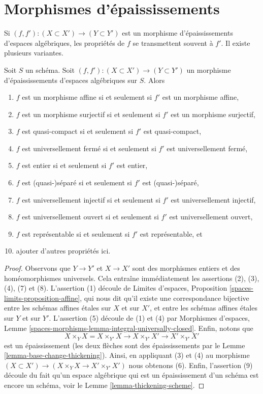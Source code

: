 \section{Morphismes d'épaississements}
\label{section-morphisms-thickenings}

\noindent
Si $(f, f') : (X \subset X') \to (Y \subset Y')$ est un morphisme
d'épaississements d'espaces algébriques, les propriétés de $f$
se transmettent souvent à $f'$. Il existe plusieurs variantes.

\begin{lemma}
\label{lemma-thicken-property-morphisms}
Soit $S$ un schéma. Soit $(f, f') : (X \subset X') \to (Y \subset Y')$
un morphisme d'épaississements d'espaces algébriques sur $S$. Alors
\begin{enumerate}
\item $f$ est un morphisme affine si et seulement si $f'$ est un morphisme affine,
\item $f$ est un morphisme surjectif si et seulement si $f'$ est un morphisme surjectif,
\item $f$ est quasi-compact si et seulement si $f'$ est quasi-compact,
\item $f$ est universellement fermé si et seulement si $f'$ est universellement fermé,
\item $f$ est entier si et seulement si $f'$ est entier,
\item $f$ est (quasi-)séparé si et seulement si $f'$ est (quasi-)séparé,
\item $f$ est universellement injectif si et seulement si $f'$ est universellement injectif,
\item $f$ est universellement ouvert si et seulement si $f'$ est universellement ouvert,
\item $f$ est représentable si et seulement si $f'$ est représentable, et
\item ajouter d'autres propriétés ici.
\end{enumerate}
\end{lemma}

\begin{proof}
Observons que $Y \to Y'$ et $X \to X'$ sont des morphismes entiers et des
homéomorphismes universels. Cela entraîne immédiatement les assertions
(2), (3), (4), (7) et (8).
L'assertion (1) découle de
Limites d'espaces, Proposition \ref{spaces-limits-proposition-affine},
qui nous dit qu'il existe une correspondance bijective entre les
schémas affines étales sur $X$ et sur $X'$, et entre les schémas affines
étales sur $Y$ et sur $Y'$.
L'assertion (5) découle de (1) et (4) par
Morphismes d'espaces, Lemme
\ref{spaces-morphisms-lemma-integral-universally-closed}.
Enfin, notons que
$$
X \times_Y X = X \times_{Y'} X \to X \times_{Y'} X' \to X' \times_{Y'} X'
$$
est un épaississement (les deux flèches sont des épaississements par le
Lemme \ref{lemma-base-change-thickening}).
Ainsi, en appliquant (3) et (4) au morphisme
$(X \subset X') \to (X \times_Y X \to X' \times_{Y'} X')$
nous obtenons (6). Enfin, l'assertion (9) découle du fait qu'un espace
algébrique qui est un épaississement d'un schéma est encore un schéma, voir le
Lemme \ref{lemma-thickening-scheme}.
\end{proof}

